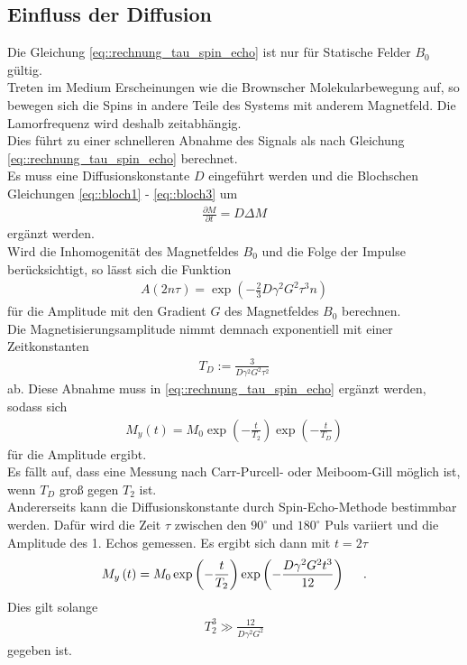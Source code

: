 \documentclass[]{scrartcl}
\begin{document}
\subsection{Einfluss der Diffusion}
Die Gleichung \ref{eq::rechnung_tau_spin_echo} ist nur für Statische Felder $B_0$ gültig.\\
Treten im Medium Erscheinungen wie die Brownscher Molekularbewegung auf, so bewegen sich die Spins in andere Teile des Systems mit anderem Magnetfeld. Die Lamorfrequenz wird deshalb zeitabhängig.\\
Dies führt zu einer schnelleren Abnahme des Signals als nach Gleichung \ref{eq::rechnung_tau_spin_echo} berechnet.\\
Es muss eine Diffusionskonstante $D$ eingeführt werden und die Blochschen Gleichungen \ref{eq::bloch1} - \ref{eq::bloch3} um
\begin{align}
\frac{\partial M}{\partial t} = D\Delta M \label{eq::bloch_diffusion}
\end{align} 
ergänzt werden.\\
Wird die Inhomogenität des Magnetfeldes $B_0$ und die Folge der Impulse berücksichtigt, so lässt sich die Funktion
\begin{align}
A\left(2n\tau\right)= \exp\left( - \frac{2}{3} D\gamma^2G^2\tau^3n\right)
\end{align}
für die Amplitude mit den Gradient $G$ des Magnetfeldes $B_0$ berechnen.\\
Die Magnetisierungsamplitude nimmt demnach exponentiell mit einer Zeitkonstanten
\begin{align}
T_D:=\frac{3}{D\gamma^2G^2\tau^2}
\end{align}  
ab. Diese Abnahme muss in \ref{eq::rechnung_tau_spin_echo} ergänzt werden, sodass sich
\begin{align}
M_y\left(t\right)=M_0\exp \left(-\frac{t}{T_2}\right)\exp \left(-\frac{t}{T_D}\right)
\end{align}
für die Amplitude ergibt.\\
Es fällt auf, dass eine Messung nach Carr-Purcell- oder Meiboom-Gill möglich ist, wenn $T_D$ groß gegen $T_2$ ist.\\
Andererseits kann die Diffusionskonstante durch Spin-Echo-Methode bestimmbar werden.
Dafür wird die Zeit $\tau$ zwischen den  $90^\circ$ und  $180^\circ$ Puls variiert und die Amplitude des 1. Echos gemessen. Es ergibt sich dann mit $t=2\tau$
\begin{align}
M_y\left(t\right)=M_0\exp \left(-\frac{t}{T_2}\right)\exp \left(-\frac{D\gamma^2G^2t^3}{12}\right)\hspace*{0.5cm}\text{.}
\end{align}
Dies gilt solange
\begin{align}
T_2^3 \gg \frac{12}{D\gamma^2 G^2}
\end{align}
gegeben ist.
\end{document}
